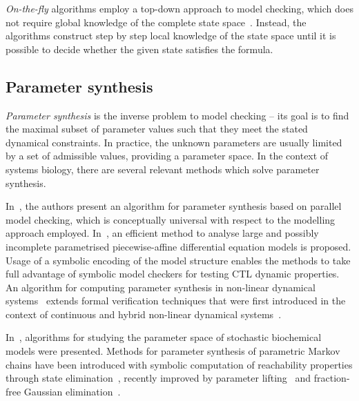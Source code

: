 \documentclass[11pt,a4paper]{report}
\begin{document}
\emph{On-the-fly} algorithms employ a top-down approach to model checking, which does not require global knowledge of the complete state space~\cite{bhat1995efficient,courcoubetis1992memory,gnesi2011abstract,holzmann2004spin,latella2014fly}. Instead, the algorithms construct step by step local knowledge of the state space until it is possible to decide whether the given state satisfies the formula. 

\subsection{Parameter synthesis}\label{synthesis}

\emph{Parameter synthesis} is the inverse problem to model checking -- its goal is to find the maximal subset of parameter values such that they meet the stated dynamical constraints. In practice, the unknown parameters are usually limited by a set of admissible values, providing a parameter space. In the context of systems biology, there are several relevant methods which solve parameter synthesis. 

In~\cite{barnat2011parameter}, the authors present an algorithm for parameter synthesis based on parallel model checking, which is conceptually universal with respect to the modelling approach employed. In~\cite{batt2010efficient}, an efficient method to analyse large and possibly incomplete parametrised piecewise-affine differential equation models is proposed. Usage of a symbolic encoding of the model structure enables the methods to take full advantage of symbolic model checkers for testing CTL dynamic properties. An algorithm for computing parameter synthesis in non-linear dynamical systems~\cite{donze2010parameter} extends formal verification techniques that were first introduced in the context of continuous and hybrid non-linear dynamical systems~\cite{donze2007systematic}.

In~\cite{jha2011synthesis}, algorithms for studying the parameter space of stochastic biochemical models were presented. Methods for parameter synthesis of parametric Markov chains have been introduced with symbolic computation of reachability properties through state elimination~\cite{daws2004symbolic,hahn2011probabilistic,jansen2014accelerating}, recently improved by parameter lifting~\cite{quatmann2016parameter} and fraction-free Gaussian elimination~\cite{hutschenreiter2017parametric}.
\end{document}
